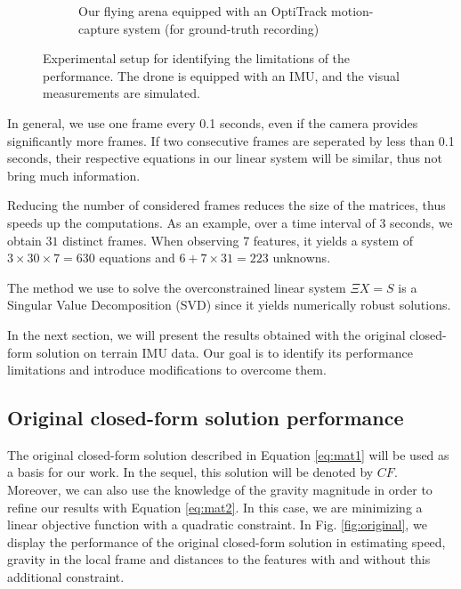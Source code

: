 \documentclass[letterpaper, 10 pt, conference]{ieeeconf}  %
\begin{document}
\begin{figure}
\begin{subfigure}[t]{0.489\columnwidth}
  \caption{Our flying arena equipped with an OptiTrack motion-capture system (for ground-truth recording)}
  \end{subfigure}
  \caption{Experimental setup for identifying the limitations of the performance.
    The drone is equipped with an IMU, and the visual measurements are simulated.
    \label{fig:testsetup}}
\end{figure}

In general, we use one frame every 0.1 seconds, even if the camera provides significantly more frames.
If two consecutive frames are seperated by less than 0.1 seconds, their respective equations in our linear system will be similar, thus not bring much information.

Reducing the number of considered frames reduces the size of the matrices, thus speeds up the computations.
As an example, over a time interval of 3 seconds, we obtain $31$ distinct frames.
When observing 7 features, it yields a system of $3\times 30\times 7 = 630$ equations and $6+7\times 31=223$ unknowns.

The method we use to solve the overconstrained linear system $\Xi X = S$ is a Singular Value Decomposition (SVD) since it yields numerically robust solutions.

In the next section, we will present the results obtained with the original closed-form solution on terrain IMU data.
Our goal is to identify its performance limitations and introduce modifications to overcome them.


\subsection{Original closed-form solution performance}

The original closed-form solution described in Equation \ref{eq:mat1} will be used as a basis for our work. In the sequel, this solution will be denoted by $CF$.
Moreover, we can also use the knowledge of the gravity magnitude in order to refine our results with Equation \ref{eq:mat2}.
In this case, we are minimizing a linear objective function with a quadratic constraint.
In Fig. \ref{fig:original}, we display the performance of the  original closed-form solution in estimating speed, gravity in the local frame and distances to the features with and without this additional constraint.
\end{document}
